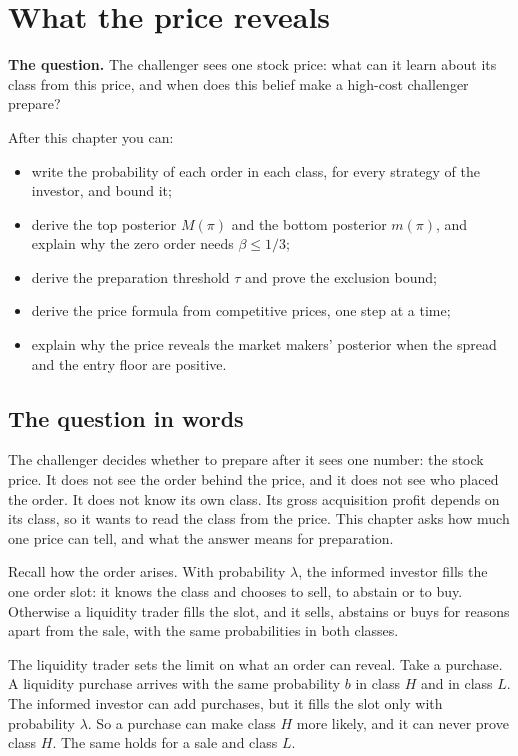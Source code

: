 \chapter{What the price reveals}\label{ch:beliefs}

\begin{chapterplan}
\textbf{The question.} The challenger sees one stock price: what can it learn about its class from this price, and when does this belief make a high-cost challenger prepare?

After this chapter you can:
\begin{itemize}
\item write the probability of each order in each class, for every strategy of the investor, and bound it;
\item derive the top posterior \(M(\pi)\) and the bottom posterior \(m(\pi)\), and explain why the zero order needs \(\beta\le1/3\);
\item derive the preparation threshold \(\tau\) and prove the exclusion bound;
\item derive the price formula from competitive prices, one step at a time;
\item explain why the price reveals the market makers' posterior when the spread and the entry floor are positive.
\end{itemize}
\end{chapterplan}

\section{The question in words}\label{sec:beliefs-words}

The challenger decides whether to prepare after it sees one number: the stock price. It does not see the order behind the price, and it does not see who placed the order. It does not know its own class. Its gross acquisition profit depends on its class, so it wants to read the class from the price. This chapter asks how much one price can tell, and what the answer means for preparation.

Recall how the order arises. With probability \(\lambda\), the informed investor fills the one order slot: it knows the class and chooses to sell, to abstain or to buy. Otherwise a liquidity trader fills the slot, and it sells, abstains or buys for reasons apart from the sale, with the same probabilities in both classes.

The liquidity trader sets the limit on what an order can reveal. Take a purchase. A liquidity purchase arrives with the same probability \(b\) in class \(H\) and in class \(L\). The informed investor can add purchases, but it fills the slot only with probability \(\lambda\). So a purchase can make class \(H\) more likely, and it can never prove class \(H\). The same holds for a sale and class \(L\).

